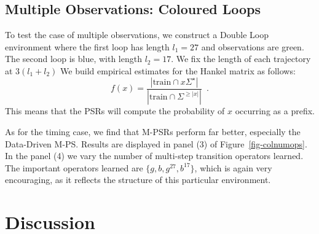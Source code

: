 \documentclass[letterpaper]{article}
\newcommand{\sstar}{\Sigma^\star}
\begin{document}
\subsection{Multiple Observations: Coloured Loops}

To test the case of multiple observations, we construct a Double Loop environment where the first loop has length $l_1=27$ and observations are green. The second loop is blue, with length $l_2=17$. We fix the length of each trajectory at 
$3 (l_1 + l_2)$
We build empirical estimates for the Hankel matrix as follows:
\begin{equation*}
f(x) = \frac{|\mathrm{train} \cap x \sstar |}{|\mathrm{train} \cap \Sigma^{\geq |x|}|} \enspace.
\end{equation*}  
This means that the PSRs will compute the probability of $x$ occurring as a prefix.

As for the timing case, we find that M-PSRs perform far better, especially the Data-Driven M-PS. Results are displayed in panel (3) of Figure~\ref{fig-colnumops}. In the panel (4) we vary the number of multi-step transition operators learned. The important operators learned are $\{g,b,g^{27},b^{17}\}$, which is again very encouraging, as it reflects the structure of this particular environment.

\section{Discussion}
\end{document}
